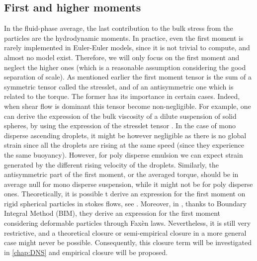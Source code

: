 \subsection{First and higher moments}
In the fluid-phase average, the last contribution to the bulk stress from the particles are the hydrodynamic moments.
In practice, even the first moment is rarely implemented in Euler-Euler models, since it is not trivial to compute, and almost no model exist.
Therefore, we will only focus on the first moment and neglect the higher ones (which is a reasonable assumption considering the good separation of scale). 
As mentioned earlier the first moment tensor is the sum of a symmetric tensor called the stresslet, and of an antisymmetric one which is related to the torque.  
The former has its importance in certain cases.
Indeed, when shear flow is dominant this tensor become non-negligible.
For example, one can derive the expression of the bulk viscosity of a dilute suspension of solid spheres, by using the expression of the stresslet tensor \citep{einstein1905neue}. 
In the case of mono disperse ascending droplets, it might be however negligible as there is no global strain since all the droplets are rising at the same speed (since they experience the same buoyancy).
However, for poly disperse emulsion we can expect strain generated by the different rising velocity of the droplets. 
Similarly, the antisymmetric part of the first moment, or the averaged torque, should be in average null for mono disperse suspension, while it might not be for poly disperse ones.
Theoretically, it is possible t derive an expression for the first moment on rigid spherical particles in stokes flows, see \cite{guazzelli2011}. 
Moreover, in \citet{dolata2021faxen}, thanks to Boundary Integral Method (BIM), they derive an expression for the first moment considering deformable particles through Faxèn laws.
Nevertheless, it is still very restrictive, and a theoretical closure or semi-empirical closure in a more general case might never be possible. 
Consequently, this closure term will be investigated in \ref{chap:DNS} and empirical closure will be proposed.  

